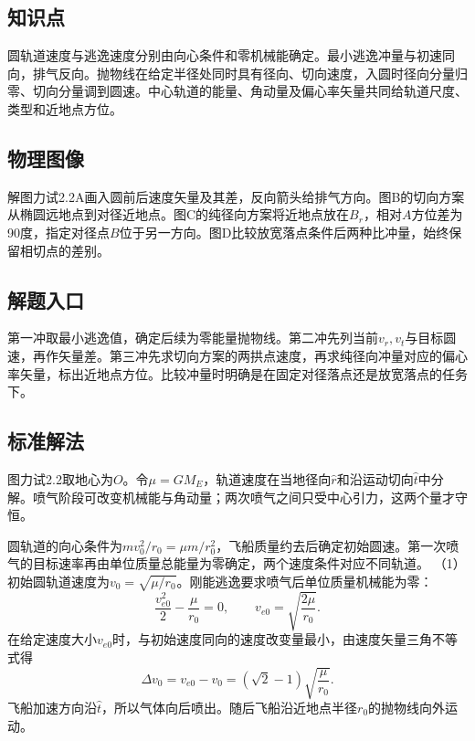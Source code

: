 \documentclass[UTF8,fontset=fandol,a4paper,11pt]{ctexart}
\begin{document}


\subsection*{知识点}

圆轨道速度与逃逸速度分别由向心条件和零机械能确定。最小逃逸冲量与初速同向，排气反向。抛物线在给定半径处同时具有径向、切向速度，入圆时径向分量归零、切向分量调到圆速。中心轨道的能量、角动量及偏心率矢量共同给轨道尺度、类型和近地点方位。



\subsection*{物理图像}

解图力试2.2A画入圆前后速度矢量及其差，反向箭头给排气方向。图B的切向方案从椭圆远地点到对径近地点。图C的纯径向方案将近地点放在$B_r$，相对$A$方位差为90度，指定对径点$B$位于另一方向。图D比较放宽落点条件后两种比冲量，始终保留相切点的差别。



\subsection*{解题入口}

第一冲取最小逃逸值，确定后续为零能量抛物线。第二冲先列当前$v_r,v_t$与目标圆速，再作矢量差。第三冲先求切向方案的两拱点速度，再求纯径向冲量对应的偏心率矢量，标出近地点方位。比较冲量时明确是在固定对径落点还是放宽落点的任务下。



\subsection*{标准解法}


图力试2.2取地心为$O$。令$\mu=GM_E$，轨道速度在当地径向$\hat r$和沿运动切向$\hat t$中分解。喷气阶段可改变机械能与角动量；两次喷气之间只受中心引力，这两个量才守恒。

圆轨道的向心条件为$m v_0^2/r_0=\mu m/r_0^2$，飞船质量约去后确定初始圆速。第一次喷气的目标速率再由单位质量总能量为零确定，两个速度条件对应不同轨道。
（1）初始圆轨道速度为$v_0=\sqrt{\mu/r_0}$。刚能逃逸要求喷气后单位质量机械能为零：
\[
\frac{v_{e0}^2}{2}-\frac{\mu}{r_0}=0,\qquad
v_{e0}=\sqrt{\frac{2\mu}{r_0}}.
\]
在给定速度大小$v_{e0}$时，与初始速度同向的速度改变量最小，由速度矢量三角不等式得
\[
\boxed{\Delta v_0=v_{e0}-v_0
=(\sqrt2-1)\sqrt{\frac{\mu}{r_0}}}.
\]
飞船加速方向沿$\hat t$，所以气体向后喷出。随后飞船沿近地点半径$r_0$的抛物线向外运动。
\end{document}
